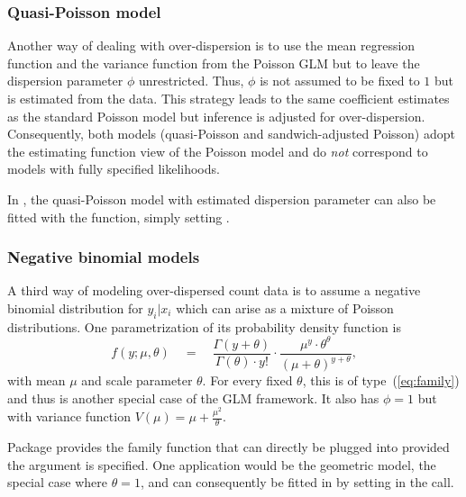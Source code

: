 \documentclass{Z}
\newcommand{\fct}[1]{\code{#1()}}
\begin{document}
\subsubsection{Quasi-Poisson model}

Another way of dealing with over-dispersion is to use the mean
regression function and the variance function from the Poisson GLM
but to leave the dispersion parameter $\phi$ unrestricted. Thus,
$\phi$ is not assumed to be fixed to $1$ but is estimated from
the data. This strategy leads
to the same coefficient estimates as the standard Poisson model
but inference is adjusted for over-dispersion. Consequently,
both models (quasi-Poisson and sandwich-adjusted Poisson)
adopt the estimating function view of the Poisson model and
do \emph{not} correspond to models with fully specified likelihoods.

In , the quasi-Poisson model with estimated dispersion
parameter can also be fitted with the \fct{glm} function, simply
setting .

\subsubsection{Negative binomial models}

A third way of modeling over-dispersed count data is to assume
a negative binomial distribution for $y_i | x_i$ which can arise
as a mixture of Poisson distributions. One parametrization of
its probability density function is
\begin{equation} \label{eq:negbin}
f(y; \mu, \theta) \quad = \quad \frac{\Gamma(y + \theta)}{\Gamma(\theta) \cdot y!} \cdot
                            \frac{\mu^{y} \cdot \theta^\theta}{(\mu + \theta)^{y + \theta}},
\end{equation}
with mean $\mu$ and scale parameter $\theta$. For every fixed
$\theta$, this is of type~(\ref{eq:family}) and thus is another
special case of the GLM framework. It also has $\phi = 1$
but with variance function $V(\mu) = \mu + \frac{\mu^2}{\theta}$.

Package  \citep{countreg:Venables+Ripley:2002} provides
the family function \fct{negative.binomial} that can directly
be plugged into \fct{glm} provided the  argument is
specified. One application would be the geometric model, the
special case where $\theta = 1$, and can consequently be
fitted in  by setting
 in the \fct{glm}
call.
\end{document}
